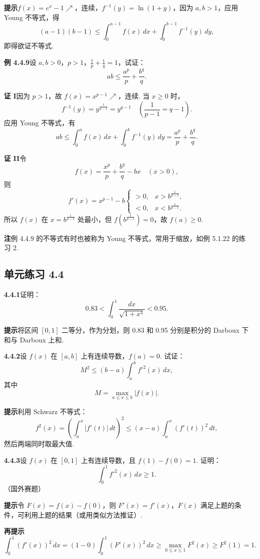 \documentclass[UTF8,12pt,a4paper,fontset=fandol]{ctexart}
\begin{document}
\noindent\textbf{提示}\quad $f(x)=e^x-1\nearrow$，连续，$f^{-1}(y)=\ln(1+y)$，因为 $a,b>1$，应用 Young 不等式，得
\[
(a-1)(b-1)\le\int_0^{a-1}f(x)\,dx+\int_0^{b-1}f^{-1}(y)\,dy,
\]
即得欲证不等式.

\noindent\textbf{例 4.4.9}\quad 设 $a,b>0$，$p>1$，$\frac1p+\frac1q=1$，试证：
\[
ab\le\frac{a^p}{p}+\frac{b^q}{q}.
\]

\noindent\textbf{证 I}\quad 因为 $p>1$，故 $f(x)=x^{p-1}\nearrow$，连续. 当 $x\ge0$ 时，
\[
f^{-1}(y)=y^{\frac1{p-1}}=y^{q-1}\quad\left(\frac1{p-1}=q-1\right).
\]
应用 Young 不等式，有
\[
ab\le\int_0^a f(x)\,dx+\int_0^b f^{-1}(y)\,dy
=\frac{a^p}{p}+\frac{b^q}{q}.
\]

\noindent\textbf{证 II}\quad 令
\[
f(x)=\frac{x^p}{p}+\frac{b^q}{q}-bx\quad(x>0),
\]
则
\[
f'(x)=x^{p-1}-b
\begin{cases}
>0,& x>b^{\frac1{p-1}},\\
<0,& x<b^{\frac1{p-1}}.
\end{cases}
\]
所以 $f(x)$ 在 $x=b^{\frac1{p-1}}$ 处最小，但 $f(b^{\frac1{p-1}})=0$，故 $f(a)\ge0$.

\noindent\textbf{注}\quad 例 4.4.9 的不等式有时也被称为 Young 不等式，常用于缩放，如例 5.1.22 的练习 2.

\subsection*{单元练习 4.4}

\noindent\textbf{4.4.1}\quad 证明：
\[
0.83<\int_0^1\frac{dx}{\sqrt{1+x^4}}<0.95.
\]

\noindent\textbf{提示}\quad 将区间 $[0,1]$ 二等分，作为分划，则 0.83 和 0.95 分别是积分的 Darboux 下和与 Darboux 上和.

\noindent\textbf{4.4.2}\quad 设 $f(x)$ 在 $[a,b]$ 上有连续导数，$f(a)=0$. 试证：
\[
M^2\le(b-a)\int_a^b f'^2(x)\,dx,
\]
其中
\[
M=\max_{a\le x\le b}|f(x)|.
\]

\noindent\textbf{提示}\quad 利用 Schwarz 不等式：
\[
f^2(x)=\left(\int_a^x |f'(t)|\,dt\right)^2
\le(x-a)\int_a^x(f'(t))^2\,dt,
\]
然后两端同时取最大值.

\noindent\textbf{4.4.3}\quad 设 $f(x)$ 在 $[0,1]$ 上有连续导数，且 $f(1)-f(0)=1$. 证明：
\[
\int_0^1 f'^2(x)\,dx\ge1.
\]
（国外赛题）

\noindent\textbf{提示}\quad 令 $F(x)=f(x)-f(0)$，则 $F'(x)=f'(x)$，$F(x)$ 满足上题的条件，可利用上题的结果（或用类似方法推证）.

\noindent\textbf{再提示}\quad
\[
\int_0^1(f'(x))^2\,dx=(1-0)\int_0^1(F'(x))^2\,dx
\ge\max_{0\le x\le1}F^2(x)\ge F^2(1)=1.
\]
\end{document}
